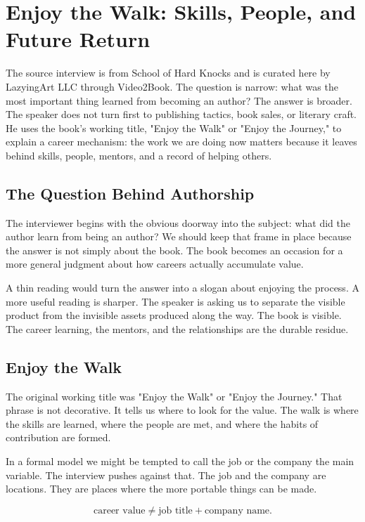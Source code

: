 \chapter{Enjoy the Walk: Skills, People, and Future Return}

The source interview is from School of Hard Knocks and is curated here by LazyingArt LLC through Video2Book. The question is narrow: what was the most important thing learned from becoming an author? The answer is broader. The speaker does not turn first to publishing tactics, book sales, or literary craft. He uses the book's working title, "Enjoy the Walk" or "Enjoy the Journey," to explain a career mechanism: the work we are doing now matters because it leaves behind skills, people, mentors, and a record of helping others.

\section{The Question Behind Authorship}

The interviewer begins with the obvious doorway into the subject: what did the author learn from being an author? We should keep that frame in place because the answer is not simply about the book. The book becomes an occasion for a more general judgment about how careers actually accumulate value.

A thin reading would turn the answer into a slogan about enjoying the process. A more useful reading is sharper. The speaker is asking us to separate the visible product from the invisible assets produced along the way. The book is visible. The career learning, the mentors, and the relationships are the durable residue.

\section{Enjoy the Walk}

The original working title was "Enjoy the Walk" or "Enjoy the Journey." That phrase is not decorative. It tells us where to look for the value. The walk is where the skills are learned, where the people are met, and where the habits of contribution are formed.

In a formal model we might be tempted to call the job or the company the main variable. The interview pushes against that. The job and the company are locations. They are places where the more portable things can be made.

\[
\text{career value} \neq \text{job title} + \text{company name}.
\]


